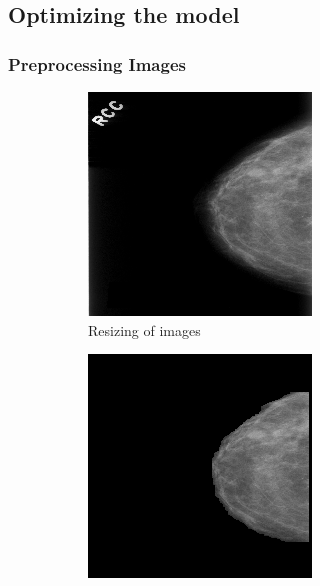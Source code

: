 \documentclass[sn-mathphys,Numbered]{sn-jnl}%
\theoremstyle{thmstyleone}%
\theoremstyle{thmstyletwo}%
\theoremstyle{thmstylethree}%
\begin{document}
\subsection{Optimizing the model}
\label{Optimization}
\subsubsection{Preprocessing Images}
\label{Preprocessing}
\begin{figure}[ht]
  \centering
  \begin{subfigure}{0.22\textwidth}
    \centering
    \includegraphics[width=\linewidth]{resized.png}
    \caption{Resizing of images}
  \end{subfigure}%
  \hfill
  \begin{subfigure}{0.22\textwidth}
    \centering
    \includegraphics[width=\linewidth]{artefacts_removed.png}

\end{subfigure}
\end{figure}
\end{document}
